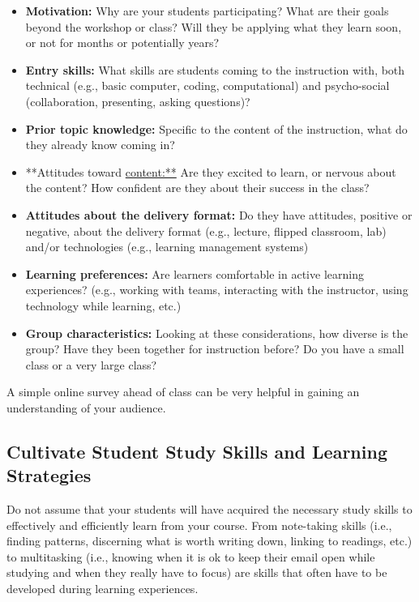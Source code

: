 \documentclass[]{book}
\providecommand{\tightlist}{%
  \setlength{\itemsep}{0pt}\setlength{\parskip}{0pt}}
\begin{document}
\begin{itemize}
\tightlist
\item
  \textbf{Motivation:} Why are your students participating? What are
  their goals beyond the workshop or class? Will they be applying what
  they learn soon, or not for months or potentially years?
\item
  \textbf{Entry skills:} What skills are students coming to the
  instruction with, both technical (e.g., basic computer, coding,
  computational) and psycho-social (collaboration, presenting, asking
  questions)?
\item
  \textbf{Prior topic knowledge:} Specific to the content of the
  instruction, what do they already know coming in?
\item
  **Attitudes toward \url{content:**} Are they excited to learn, or
  nervous about the content? How confident are they about their success
  in the class?
\item
  \textbf{Attitudes about the delivery format:} Do they have attitudes,
  positive or negative, about the delivery format (e.g., lecture,
  flipped classroom, lab) and/or technologies (e.g., learning management
  systems)
\item
  \textbf{Learning preferences:} Are learners comfortable in active
  learning experiences? (e.g., working with teams, interacting with the
  instructor, using technology while learning, etc.)
\item
  \textbf{Group characteristics:} Looking at these considerations, how
  diverse is the group? Have they been together for instruction before?
  Do you have a small class or a very large class?
\end{itemize}

A simple online survey ahead of class can be very helpful in gaining an
understanding of your audience.

\subsection{Cultivate Student Study Skills and Learning
Strategies}\label{cultivate-student-study-skills-and-learning-strategies}

Do not assume that your students will have acquired the necessary study
skills to effectively and efficiently learn from your course. From
note-taking skills (i.e., finding patterns, discerning what is worth
writing down, linking to readings, etc.) to multitasking (i.e., knowing
when it is ok to keep their email open while studying and when they
really have to focus) are skills that often have to be developed during
learning experiences.
\end{document}
